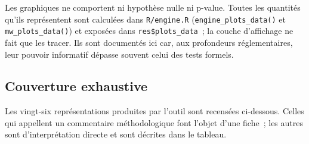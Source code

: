 \documentclass[a4paper,11pt]{article}
\newcommand{\code}[1]{\texttt{\small #1}}
\begin{document}
Les graphiques ne comportent ni hypothèse nulle ni p-value. Toutes les quantités
qu'ils représentent sont calculées dans \code{R/engine.R}
(\code{engine\_plots\_data()} et \code{mw\_plots\_data()}) et exposées dans
\code{res\$plots\_data}~; la couche d'affichage ne fait que les tracer. Ils sont
documentés ici car, aux profondeurs réglementaires, leur pouvoir informatif
dépasse souvent celui des tests formels.

\subsection{Couverture exhaustive}

Les vingt-six représentations produites par l'outil sont recensées ci-dessous.
Celles qui appellent un commentaire méthodologique font l'objet d'une fiche~; les
autres sont d'interprétation directe et sont décrites dans le tableau.
\end{document}
